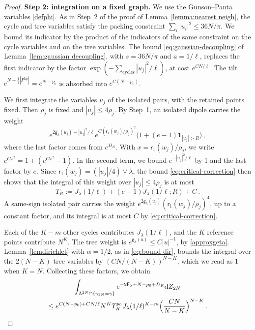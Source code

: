\documentclass[a4paper,10pt,leqno]{amsart}
\numberwithin{equation}{section}
\newcommand{\dd}{\mathrm{d}}
\def\indic{\mathbf{1}}
\def\g{\mathsf{g}}
\def\F{\mathsf{F}}
\def\rr{\mathsf{r}}
\newcommand{\dip}{\mathrm{dip}}
\begin{document}
\begin{proof}
  \smallskip
  \noindent
  \textbf{Step 2: integration on a fixed graph.}
  We use the Gunson--Panta variables \eqref{defphi}. As in Step~2 of the proof of Lemma~\ref{lemma:nearest neigh}, the cycle and tree variables satisfy the packing constraint $\sum_i|u_i|^2\le36N/\pi$. We bound its indicator by the product of the indicators of the same constraint on the cycle variables and on the tree variables. The bound \eqref{eq:gaussian-decoupling} of Lemma~\ref{lem:gaussian decoupling}, with $s=36N/\pi$ and $a=1/\ell$, replaces the first indicator by the factor $\exp(-\sum_{\text{cycles}}|u_j|^2/\ell)$, at cost $e^{CN/\ell}$. The tilt $e^{N-\frac12|I^{\dip}|}=e^{N-p_0}$ is absorbed into $e^{C(N-p_0)}$.

  We first integrate the variables $u_j$ of the isolated pairs, with the retained points fixed. Then $\rho_j$ is fixed and $|u_j|\le4\rho_j$. By Step~1, an isolated dipole carries the weight
  \[
    e^{2\g_\lambda(u_j)-|u_j|^2/\ell}e^{C(\rr_1(w_j)/\rho_j)^2}\bigl(1+(e-1)\indic_{|u_j|>R}\bigr)\,,
  \]
  where the last factor comes from $e^{D_R}$. With $x=\rr_1(w_j)/\rho_j$, we write $e^{Cx^2}=1+(e^{Cx^2}-1)$. In the second term, we bound $e^{-|u_j|^2/\ell}$ by $1$ and the last factor by $e$. Since $\rr_1(w_j)=(|u_j|/4)\vee\lambda$, the bound \eqref{eq:critical-correction} then shows that the integral of this weight over $|u_j|\le4\rho_j$ is at most
  \[
    T_R:=J_\lambda(1/\ell)+(e-1)J_\lambda(1/\ell;R)+C\,.
  \]
  A same-sign isolated pair carries the weight $e^{2\g_\lambda(u_j)}(\rr_1(w_j)/\rho_j)^4$, up to a constant factor, and its integral is at most $C$ by \eqref{eq:critical-correction}.

  Each of the $K-m$ other cycles contributes $J_\lambda(1/\ell)$, and the $K$ reference points contribute $N^K$. The tree weight is $e^{\g_\lambda(u)}\le C|u|^{-1}$, by \eqref{approxgeta}. Lemma~\ref{lemdirichlet} with $\alpha=1/2$, as in \eqref{eq:bound dir}, bounds the integral over the $2(N-K)$ tree variables by $(CN/(N-K))^{N-K}$, which we read as $1$ when $K=N$. Collecting these factors, we obtain
  \begin{multline}\label{eq:critical-fixed-graph}
    \int_{\Lambda^{2N}\cap\{\gamma_{2N}=\gamma\}}e^{-2\F_\lambda+N-p_0+D_R}\dd Z_{2N}\\
    \le e^{C(N-p_0)+CN/\ell}N^KT_R^{p_0}J_\lambda(1/\ell)^{K-m}\Bigl(\frac{CN}{N-K}\Bigr)^{N-K}\,.
  \end{multline}


\end{proof}
\end{document}
